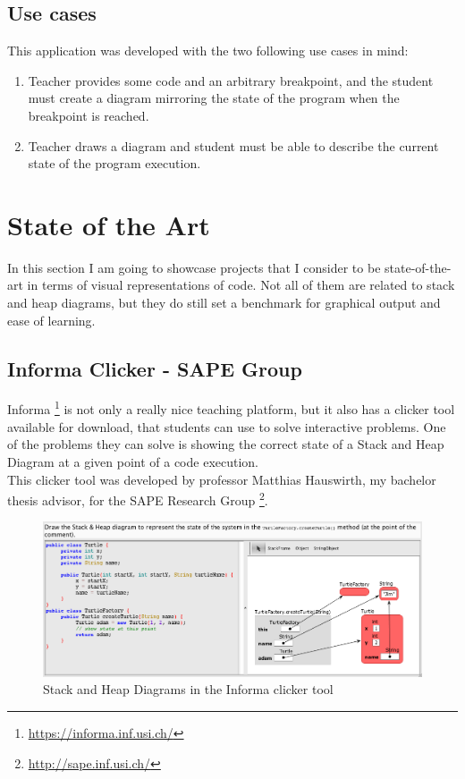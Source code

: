 \documentclass[]{usiinfbachelorproject}
\begin{document}
\subsection{Use cases}

This application was developed with the two following use cases in mind:

\begin{enumerate}
\item Teacher provides some code and an arbitrary breakpoint, and the student must create  a diagram mirroring the state of the program when the breakpoint is reached.
\item Teacher draws a diagram and student must be able to describe the current state of the program execution.
\end{enumerate}

\vspace{\fill}

\pagebreak

\section{State of the Art} \label{state}

In this section I am going to showcase projects that I consider to be state-of-the-art in terms of visual representations of code. Not all of them are related to stack and heap diagrams, but they do still set a benchmark for graphical output and ease of learning.

\subsection{Informa Clicker - SAPE Group}

\noindent Informa \footnote{\url{https://informa.inf.usi.ch/}} is not only a really nice teaching platform, but it also has a clicker tool available for download, that students can use to solve interactive problems. One of the problems they can solve is showing the correct state of a Stack and Heap Diagram at a given point of a code execution.\\

\noindent This clicker tool was developed by professor Matthias Hauswirth, my bachelor thesis advisor, for the SAPE Research Group \footnote{\url{http://sape.inf.usi.ch/}}.

\begin{figure}[h!]
\includegraphics[scale=0.4]{figures/informa_clicker.png}
\centering
\caption {Stack and Heap Diagrams in the Informa clicker tool}
\end{figure}
\end{document}
